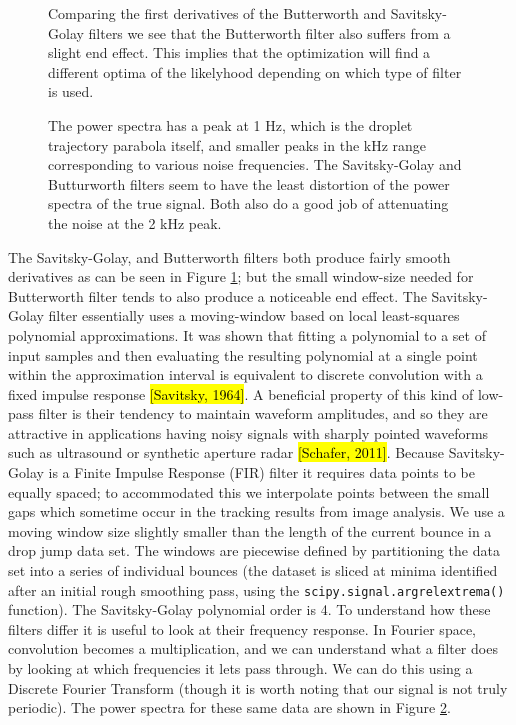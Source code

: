 \documentclass[10pt,a4paper]{article}
\begin{document}
\begin{figure}
    \centering
    
    \caption{Comparing the first derivatives of the Butterworth and Savitsky-Golay filters we see that the Butterworth filter also suffers from a slight end effect. This implies that the optimization will find a different optima of the likelyhood depending on which type of filter is used.\label{fig:dy_filtered}}
\end{figure}

\begin{figure}
    \centering
    
    \caption{The power spectra has a peak at 1 Hz, which is the droplet trajectory parabola itself, and smaller peaks in the kHz range corresponding to various noise frequencies. The Savitsky-Golay and Butturworth filters seem to have the least distortion of the power spectra of the true signal. Both also do a good job of attenuating the noise at the 2 kHz peak. \label{fig:power}}
\end{figure}


The Savitsky-Golay, and Butterworth filters both produce fairly smooth derivatives as can be seen in Figure \ref{fig:dy_filtered}; but the small window-size needed for Butterworth filter tends to also produce a noticeable end effect. The Savitsky-Golay filter essentially uses a moving-window based on local least-squares polynomial approximations. It was shown that fitting a polynomial to a set of input samples and then evaluating the resulting polynomial at a single point within the approximation interval is equivalent to discrete convolution with a fixed impulse response \hl{[Savitsky, 1964]}. A beneficial property of this kind of low-pass filter is their tendency to maintain waveform amplitudes, and so they are attractive in applications having noisy signals with sharply pointed waveforms such as ultrasound or synthetic aperture radar \hl{[Schafer, 2011]}. Because Savitsky-Golay is a Finite Impulse Response (FIR) filter it requires data points to be equally spaced; to accommodated this we interpolate points between the small gaps which sometime occur in the tracking results from image analysis. We use a moving window size slightly smaller than the length of the current bounce in a drop jump data set. The windows are piecewise defined by partitioning the data set into a series of individual bounces (the dataset is sliced at minima identified after an initial rough smoothing pass, using the \verb|scipy.signal.argrelextrema()| function). The Savitsky-Golay polynomial order is 4. To understand how these filters differ it is useful to look at their frequency response. In Fourier space, convolution becomes a multiplication, and we can understand what a filter does by looking at which frequencies it lets pass through. We can do this using a Discrete Fourier Transform (though it is worth noting that our signal is not truly periodic). The power spectra for these same data are shown in Figure \ref{fig:power}. 
\end{document}

